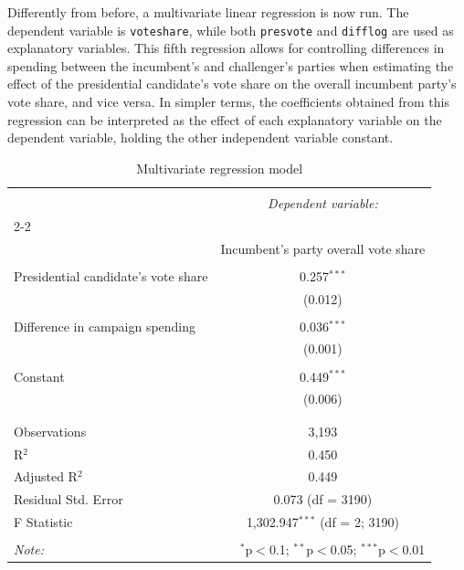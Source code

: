\documentclass[12pt,letterpaper]{article}
\begin{document}
\vspace{0.5cm}
\noindent Differently from before, a multivariate linear regression is now run. The dependent variable is \texttt{voteshare}, while both \texttt{presvote} and \texttt{difflog} are used as explanatory variables. This fifth regression allows for controlling differences in spending between the incumbent’s and challenger’s parties when estimating the effect of the presidential candidate’s vote share on the overall incumbent party’s vote share, and vice versa. In simpler terms, the coefficients obtained from this regression can be interpreted as the effect of each explanatory variable on the dependent variable, holding the other independent variable constant.
  
\begin{table}[H] \centering 
	\caption{Multivariate regression model} 
	\label{} 
	\begin{tabular}{@{\extracolsep{5pt}}lc} 
		\\[-1.8ex]\hline 
		\hline \\[-1.8ex] 
		& \multicolumn{1}{c}{\textit{Dependent variable:}} \\ 
		\cline{2-2} 
		\\[-1.8ex] & Incumbent's party overall vote share \\ 
		\hline \\[-1.8ex] 
		Presidential candidate's vote share & 0.257$^{***}$ \\ 
		& (0.012) \\ 
		& \\ 
		Difference in campaign spending & 0.036$^{***}$ \\ 
		& (0.001) \\ 
		& \\ 
		Constant & 0.449$^{***}$ \\ 
		& (0.006) \\ 
		& \\ 
		\hline \\[-1.8ex] 
		Observations & 3,193 \\ 
		R$^{2}$ & 0.450 \\ 
		Adjusted R$^{2}$ & 0.449 \\ 
		Residual Std. Error & 0.073 (df = 3190) \\ 
		F Statistic & 1,302.947$^{***}$ (df = 2; 3190) \\ 
		\hline 
		\hline \\[-1.8ex] 
		\textit{Note:}  & \multicolumn{1}{r}{$^{*}$p$<$0.1; $^{**}$p$<$0.05; $^{***}$p$<$0.01} \\ 
	\end{tabular} 
\end{table} 
\end{document}
